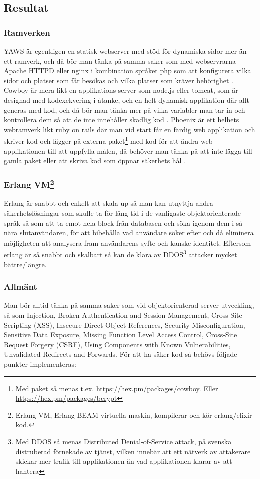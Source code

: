 \documentclass[12pt]{article}
\begin{document}
\subsection{ Resultat}
\subsubsection*{Ramverken}
YAWS är egentligen en statisk webserver med stöd för dynamiska sidor mer än ett ramverk, och då bör man tänka på samma saker som med webservrarna Apache HTTPD eller nginx i kombination språket php som att konfigurera vilka sidor och platser som får besökas och vilka platser som kräver behörighet \cite{yaws}.
Cowboy är mera likt en applikations server som node.js eller tomcat, som är designad med kodexekvering i åtanke, och en helt dynamisk applikation där allt generas med kod, och då bör man tänka mer på vilka variabler man tar in och kontrollera dem så att de inte innehåller skadlig kod \cite{cowboy}.
Phoenix är ett helhets webramverk likt ruby on rails där man vid start får en färdig web applikation och skriver kod och lägger på externa paket\footnote{Med paket så menas t.ex.
\url{https://hex.pm/packages/cowboy}.
Eller \url{https://hex.pm/packages/bcrypt}} med kod för att ändra web applikationen till att uppfylla målen, då behöver man tänka på att inte lägga till gamla paket eller att skriva kod som öppnar säkerhets hål \cite{phoenix/ruby,phoenix/rails,phoenix}.
\subsubsection*{Erlang VM\footnote{Erlang VM, Erlang BEAM virtuella maskin, kompilerar och kör erlang/elixir kod\cite{erlang}.}}
	Erlang är snabbt och enkelt att skala up så man kan utnyttja andra säkerhetslösningar som skulle ta för lång tid i de vanligaste objektorienterade språk  så som att ta emot hela block från databasen och söka igenom dem i så nära slutanvändaren, för att bibehålla vad användare söker efter och då eliminera möjligheten att analysera fram användarens syfte och kanske identitet\cite{database}.
Eftersom erlang är så snabbt och skalbart så kan de klara av DDOS\footnote{Med DDOS så menas Distributed Denial-of-Service attack, på svenska distruberad förnekade av tjänst, vilken innebär att ett nätverk av attakerare skickar mer trafik till applikationen än vad applikationen klarar av att hantera} attacker mycket bättre/längre.\cite{resource-safe}
\subsubsection*{Allmänt}
	Man bör alltid tänka på samma saker som vid objektorienterad server utveckling, så som Injection, Broken Authentication and Session Management, Cross-Site Scripting (XSS), Insecure Direct Object References, Security Misconfiguration, Sensitive Data Exposure, Missing Function Level Access Control, Cross-Site Request Forgery (CSRF), Using Components with Known Vulnerabilities, Unvalidated Redirects and Forwards.
\cite{owasp}	För att ha säker kod så behövs följade punkter implementeras:
\end{document}
